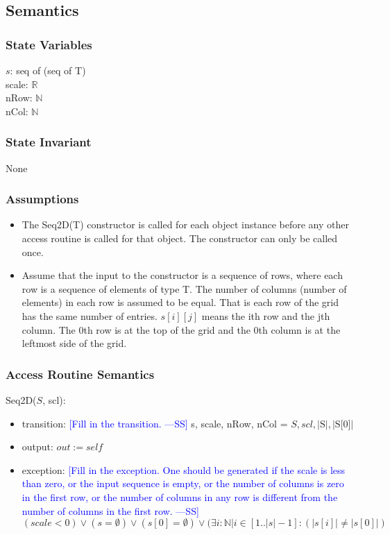 \documentclass[12pt]{article}
\newcommand{\authornote}[3]{\textcolor{#1}{[#3 ---#2]}}
\newcommand{\authornote}[3]{}
\newcommand{\wss}[1]{\authornote{blue}{SS}{#1}}
\begin{document}
\subsection* {Semantics}

\subsubsection* {State Variables}

$s$: seq of (seq of T)\\
scale: $\mathbb{R}$\\
nRow: $\mathbb{N}$\\
nCol: $\mathbb{N}$

\subsubsection* {State Invariant}

None

\subsubsection* {Assumptions}

\begin{itemize}
\item The Seq2D(T) constructor is called for each object instance before any
other access routine is called for that object.  The constructor can only be
called once.
\item Assume that the input to the constructor is a sequence of rows, where each
  row is a sequence of elements of type T.  The number of columns (number of
  elements) in each row is assumed to be equal. That is each row
  of the grid has the same number of entries.  $s[i][j]$ means the ith row and
  the jth column.  The 0th row is at the top of the grid and the 0th column
  is at the leftmost side of the grid.
\end{itemize}

\subsubsection* {Access Routine Semantics}

Seq2D($S$, scl):
\begin{itemize}
\item transition: \wss{Fill in the transition.} s, scale, nRow, nCol = $S, scl, |\text{S}|, |\text{S[0]}|$
\item output: $\mathit{out} := \mathit{self}$
\item exception: \wss{Fill in the exception.  One should be generated if the
    scale is less than zero, or the input sequence is empty, or the number of
    columns is zero in the first row, or the number of columns in any row is
    different from the number of columns in the first row.} $(scale < 0) \lor (s = \emptyset) \lor (s[0] = \emptyset) \lor (\exists i: \mathbb{N} | i \in [1 .. |s|-1] : (|s[i]| \neq |s[0]|)$
\end{itemize}
\end{document}
